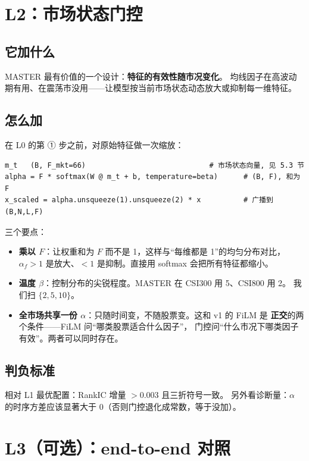 \documentclass[11pt, a4paper]{ctexart}
\begin{document}
\section{L2：市场状态门控}

\subsection{它加什么}
MASTER 最有价值的一个设计：\textbf{特征的有效性随市况变化}。
均线因子在高波动期有用、在震荡市没用——让模型按当前市场状态动态放大或抑制每一维特征。

\subsection{怎么加}
在 L0 的第 ① 步之前，对原始特征做一次缩放：

\begin{lstlisting}
m_t   (B, F_mkt=66)                             # 市场状态向量, 见 5.3 节
alpha = F * softmax(W @ m_t + b, temperature=beta)      # (B, F), 和为 F
x_scaled = alpha.unsqueeze(1).unsqueeze(2) * x          # 广播到 (B,N,L,F)
\end{lstlisting}

三个要点：
\begin{itemize}
  \item \textbf{乘以 $F$}：让权重和为 $F$ 而不是 1，这样与“每维都是 1”的均匀分布对比，
        $\alpha_f > 1$ 是放大、$< 1$ 是抑制。直接用 softmax 会把所有特征都缩小。
  \item \textbf{温度 $\beta$}：控制分布的尖锐程度。MASTER 在 CSI300 用 5、CSI800 用 2。
        我们扫 $\{2, 5, 10\}$。
  \item \textbf{全市场共享一份 $\alpha$}：只随时间变，不随股票变。这和 v1 的 FiLM 是
        \textbf{正交}的两个条件——FiLM 问“哪类股票适合什么因子”，
        门控问“什么市况下哪类因子有效”。两者可以同时存在。
\end{itemize}

\subsection{判负标准}
相对 L1 最优配置：RankIC 增量 $> 0.003$ 且三折符号一致。
另外看诊断量：$\alpha$ 的时序方差应该显著大于 0（否则门控退化成常数，等于没加）。

\section{L3（可选）：end-to-end 对照}
\end{document}
